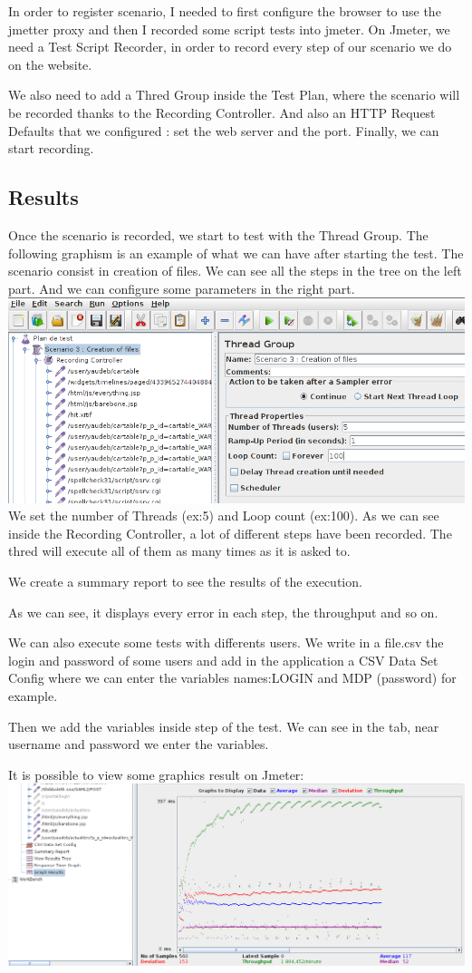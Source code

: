 In order to register scenario, I needed to first configure the browser to use the jmetter
proxy and then I recorded some script tests into jmeter. 
On Jmeter, we need a Test Script Recorder, in order to record every step of our scenario we do on the website.

We also need to add a Thred Group inside the Test Plan, where the scenario will be recorded thanks to the Recording Controller.
And also an HTTP Request Defaults that we configured : set the web server and the port.
Finally, we can start recording.

\subsection{Results}

Once the scenario is recorded, we start to test with the Thread Group.
The following graphism is an example of what we can have after starting the test. 
The scenario consist in creation of files. We can see all the steps in the tree on the left
part. And we can configure some parameters in the right part.\\ 

\includegraphics[scale=0.5]{Images/jmetter1.png} 
\\

We set the number of Threads (ex:5) and Loop count (ex:100).
As we can see inside the Recording Controller, a lot of different steps have been recorded. The thred will execute all of them as many times as it is asked to.

We create a summary report to see the results of the execution.

As we can see, it displays every error in each step,  the throughput and so on.

We can also execute some tests with differents users. We write in a file.csv the login and password of some users and add in the application a CSV Data Set Config where we can enter the variables names:LOGIN and MDP (password)  for example.

Then we add the variables inside step of the test. We can see in the tab, near username and password we enter the variables.


It is possible to view some graphics result on Jmeter: \\ 

\includegraphics[scale=0.3]{Images/jmetter2.png} 

